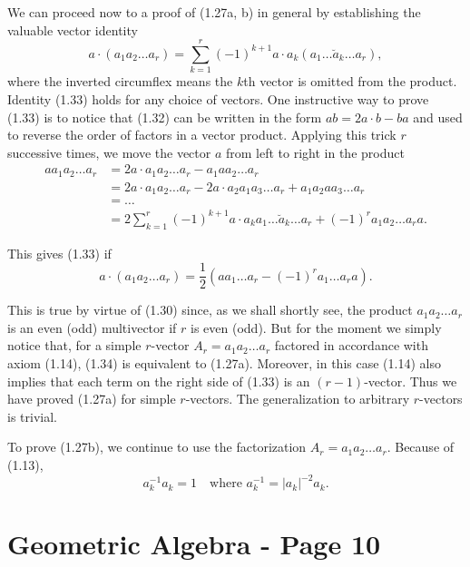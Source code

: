 \documentclass[fleqn]{scrartcl}
\numberwithin{equation}{section}
\begin{document}
\vspace{1em}
\noindent We can proceed now to a proof of (1.27a, b) in general by establishing the valuable vector identity
\begin{equation}
a \cdot (a_1 a_2 \dots a_r) = \sum_{k=1}^r (-1)^{k+1} a \cdot a_k (a_1 \dots \breve{a}_k \dots a_r), \tag{1.33}
\end{equation}
where the inverted circumflex means the \(k\)th vector is omitted from the product. Identity (1.33) holds for any choice of vectors. One instructive way to prove (1.33) is to notice that (1.32) can be written in the form \(ab = 2a \cdot b - ba\) and used to reverse the order of factors in a vector product. Applying this trick \(r\) successive times, we move the vector \(a\) from left to right in the product
\begin{align*}
aa_1a_2 \dots a_r &= 2a \cdot a_1 a_2 \dots a_r - a_1 a a_2 \dots a_r \\
&= 2a \cdot a_1 a_2 \dots a_r - 2a \cdot a_2 a_1 a_3 \dots a_r + a_1 a_2 a a_3 \dots a_r \\
&= \dots \\
&= 2 \sum_{k=1}^r (-1)^{k+1} a \cdot a_k a_1 \dots \breve{a}_k \dots a_r + (-1)^r a_1 a_2 \dots a_r a.
\end{align*}

\noindent This gives (1.33) if
\begin{equation}
a \cdot (a_1 a_2 \dots a_r) = \frac{1}{2}(a a_1 \dots a_r - (-1)^r a_1 \dots a_r a). \tag{1.34}
\end{equation}

\noindent This is true by virtue of (1.30) since, as we shall shortly see, the product \(a_1a_2 \dots a_r\) is an even (odd) multivector if \(r\) is even (odd). But for the moment we simply notice that, for a simple \(r\)-vector \(A_r = a_1a_2 \dots a_r\) factored in accordance with axiom (1.14), (1.34) is equivalent to (1.27a). Moreover, in this case (1.14) also implies that each term on the right side of (1.33) is an \((r-1)\)-vector. Thus we have proved (1.27a) for simple \(r\)-vectors. The generalization to arbitrary \(r\)-vectors is trivial.

\vspace{1em}
\noindent To prove (1.27b), we continue to use the factorization \(A_r = a_1a_2 \dots a_r\). Because of (1.13),
\[
a_k^{-1} a_k = 1 \quad \text{where } a_k^{-1} = |a_k|^{-2} a_k.
\]

\section*{Geometric Algebra - Page 10}
\end{document}
